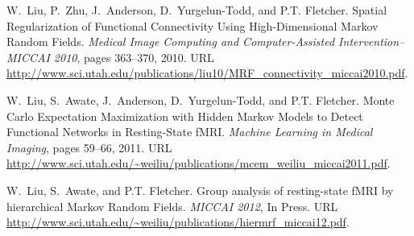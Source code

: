\documentclass[12pt]{article}
\begin{document}
\appendix
\renewcommand{\refname}{List of Publications}
\begin{thebibliography}{1}

W.~Liu, P.~Zhu, J.~Anderson, D.~Yurgelun-Todd, and P.T. Fletcher.
\newblock Spatial {R}egularization of {F}unctional {C}onnectivity {U}sing
  {H}igh-{D}imensional {M}arkov {R}andom {F}ields.
\newblock \emph{Medical Image Computing and Computer-Assisted
  Intervention--MICCAI 2010}, pages 363--370, 2010.
\newblock URL
  \url{http://www.sci.utah.edu/publications/liu10/MRF_connectivity_miccai2010.pdf}.

W.~Liu, S.~Awate, J.~Anderson, D.~Yurgelun-Todd, and P.T. Fletcher.
\newblock Monte {C}arlo {E}xpectation {M}aximization with {H}idden {M}arkov
  {M}odels to {D}etect {F}unctional {N}etworks in {R}esting-{S}tate {fMRI}.
\newblock \emph{Machine Learning in Medical Imaging}, pages 59--66, 2011.
\newblock URL
  \url{http://www.sci.utah.edu/~weiliu/publications/mcem_weiliu_miccai2011.pdf}.

W.~Liu, S.~Awate, and P.T. Fletcher.
\newblock Group analysis of resting-state {fMRI} by hierarchical {M}arkov
  {R}andom {F}ields.
\newblock \emph{MICCAI 2012}, In Press.
\newblock URL
  \url{http://www.sci.utah.edu/~weiliu/publications/hiermrf_miccai12.pdf}.


\end{thebibliography}
\end{document}
